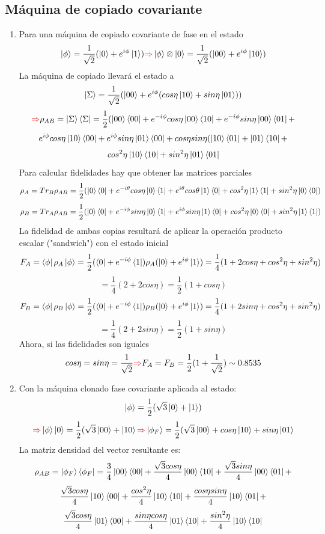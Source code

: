 \documentclass{book}
\begin{document}
\subsection{Máquina de copiado covariante}\begin{enumerate}\item 
Para una máquina de copiado covariante de fase en el estado$$\ket{\phi}=\frac{1}{\sqrt{2}}(\ket{0}+e^{i\phi}\ket{1})\textcolor{red}{\Rightarrow}\ket{\phi}\otimes\ket{0}=\frac{1}{\sqrt{2}}(\ket{00}+e^{i\phi}\ket{10})$$ La máquina de copiado llevará el estado a 
$$\ket{\Sigma}=\frac{1}{\sqrt{2}}(\ket{00}+e^{i\phi}(cos\eta\ket{10}+sin\eta\ket{01}))$$ $$\textcolor{red}{\Rightarrow} \rho_{AB}=\ket{\Sigma}\bra{\Sigma}=\frac{1}{2}(\ket{00}\bra{00}+e^{-i\phi}cos\eta\ket{00}\bra{10}+e^{-i\phi}sin\eta\ket{00}\bra{01}+ $$ $$ e^{i\phi}cos\eta\ket{10}\bra{00}+e^{i\phi}sin\eta\ket{01}\bra{00}+cos\eta sin\eta (\ket{10}\bra{01}+\ket{01}\bra{10}+$$ $$ cos^2\eta\ket{10}\bra{10}+sin^2\eta\ket{01}\bra{01}$$
Para calcular fidelidades hay que obtener las matrices parciales
$$\rho_A=Tr_B\rho_{AB}=\frac{1}{2}(\ket{0}\bra{0}+e^{-i\theta}cos\eta\ket{0}\bra{1}+e^{i\theta}cos\theta\ket{1}\bra{0}+cos^2\eta\ket{1}\bra{1}+sin^2\eta\ket{0}\bra{0})$$
$$\rho_B=Tr_A\rho_{AB}=\frac{1}{2}(\ket{0}\bra{0}+e^{-i\phi}sin\eta\ket{0}\bra{1}+e^{i\phi}sin\eta\ket{1}\bra{0}+cos^2\eta\ket{0}\bra{0}+sin^2\eta\ket{1}\bra{1})$$
La fidelidad de ambas copias resultará de aplicar la operación producto escalar ("sandwich") con el estado inicial
$$ F_A=\bra{\phi}\rho_A\ket{\phi}=\frac{1}{2}(\bra{0}+e^{-i\phi}\bra{1})\rho_A(\ket{0}+e^{i\phi}\ket{1})=\frac{1}{4}(1+2cos\eta+cos^2\eta+sin^2 \eta)$$ $$=\frac{1}{4}(2+2cos\eta)=\frac{1}{2}(1+cos\eta)$$
$$ F_B=\bra{\phi}\rho_B\ket{\phi}=\frac{1}{2}(\bra{0}+e^{-i\phi}\bra{1})\rho_B(\ket{0}+e^{i\phi}\ket{1})=\frac{1}{4}(1+2sin\eta+cos^2\eta+sin^2 \eta)$$ $$=\frac{1}{4}(2+2sin\eta)=\frac{1}{2}(1+sin\eta)$$ 
$$ $$Ahora, si las fidelidades son iguales $$cos\eta=sin\eta=\frac{1}{\sqrt{2}}\textcolor{red}{\Rightarrow} F_A=F_B=\frac{1}{2}(1+\frac{1}{\sqrt{2}})\sim 0.8535$$
\item Con la máquina clonado fase covariante aplicada al estado:
$$ \ket{\phi}=\frac{1}{2}(\sqrt{3}\ket{0}+\ket{1})$$
$$\textcolor{red}{\Rightarrow}  \ket{\phi}\ket{0}=\frac{1}{2}(\sqrt{3}\ket{00}+\ket{10} \textcolor{red}{\Rightarrow}  \ket{\phi_F}=\frac{1}{2}(\sqrt{3}\ket{00}+cos\eta\ket{10}+sin\eta\ket{01}$$
La matriz densidad del vector resultante es:
$$\rho_{AB}=\ket{\phi_F}\bra{\phi_F}=\frac{3}{4}\ket{00}\bra{00}+\frac{\sqrt{3}cos \eta}{4}\ket{00}\bra{10}+\frac{\sqrt{3}sin \eta}{4}\ket{00}\bra{01}+$$ $$\frac{\sqrt{3}cos \eta}{4}\ket{10}\bra{00}+\frac{cos^2\eta}{4}\ket{10}\bra{10}+\frac{cos\eta sin\eta}{4}\ket{10}\bra{01}+ $$ $$\frac{\sqrt{3}cos \eta}{4}\ket{01}\bra{00}+\frac{sin\eta cos\eta}{4}\ket{01}\bra{10}+\frac{sin^2\eta}{4}\ket{10}\bra{10}$$

\end{enumerate}
\end{document}
